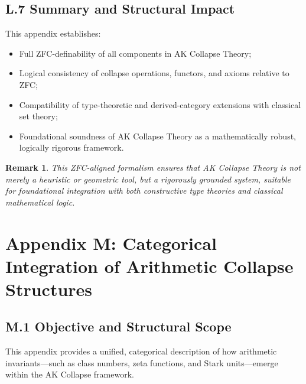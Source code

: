 \documentclass[11pt]{article}
\newtheorem{remark}[theorem]{Remark}
\begin{document}
\subsection*{L.7 Summary and Structural Impact}

This appendix establishes:

\begin{itemize}
    \item Full ZFC-definability of all components in AK Collapse Theory;
    \item Logical consistency of collapse operations, functors, and axioms relative to ZFC;
    \item Compatibility of type-theoretic and derived-category extensions with classical set theory;
    \item Foundational soundness of AK Collapse Theory as a mathematically robust, logically rigorous framework.
\end{itemize}

\begin{remark}
This ZFC-aligned formalism ensures that AK Collapse Theory is not merely a heuristic or geometric tool,  
but a rigorously grounded system, suitable for foundational integration with both constructive type theories and classical mathematical logic.
\end{remark}




\section*{Appendix M: Categorical Integration of Arithmetic Collapse Structures}

\subsection*{M.1 Objective and Structural Scope}

This appendix provides a unified, categorical description of how arithmetic invariants—such as class numbers, zeta functions, and Stark units—emerge within the AK Collapse framework.  
\end{document}
